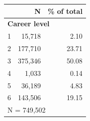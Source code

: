 \begin{tabular}{lrr}


\toprule


 & N & \% of total \\


\midrule


\multicolumn{3}{l}{\textbf{Career level}}\\ 
\midrule
1                   &      15,718&        2.10\\
2                   &     177,710&       23.71\\
3                   &     375,346&       50.08\\
4                   &       1,033&        0.14\\
5                   &      36,189&        4.83\\
6                   &     143,506&       19.15\\
\midrule


\multicolumn{3}{l}{\footnotesize N =      749,502}\\


\bottomrule


\end{tabular}


